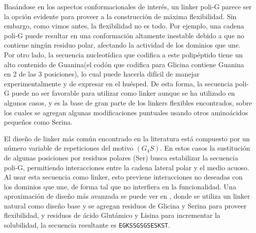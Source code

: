 
Basándose en los aspectos conformacionales de interés, un linker poli-G parece ser la opción evidente para proveer a la construcción de máxima flexibilidad.
Sin embargo, como vimos antes, la flexibilidad no es todo. 
Por ejemplo, una cadena poli-G puede resultar en una conformación altamente inestable debido a que no contiene ningún residuo polar, afectando la actividad de los dominios que une\cite{robinson1998optimizing}. 
Por otro lado, la secuencia nucleotídica que codifica a este polipéptido tiene un alto contenido de Guanina(el codón que codifica para Glicina contiene Guanina en 2 de las 3 posiciones), lo cual  
puede hacerla difícil de manejar experimentalmente y de expresar en el huésped\cite{trinh2004optimization}.
De esta forma, la secuencia poli-G puede no ser favorable para utilizar como linker aunque se ha utilizado en algunos casos\cite{iwakura1998effects,de2012characterization,sabourin2007flexible}, 
y es la base de gran parte de los linkers flexibles encontrados, sobre los cuales se agregan algunas modificaciones puntuales usando otros aminoácidos pequeños como Serina.%

El diseño de linker más común encontrado en la literatura está compuesto por un número variable de repeticiones del motivo $(G_4S)$. %
En estos casos la sustitución de algunas posiciones por residuos polares (Ser) busca estabilizar la secuencia poli-G, permitiendo interacciones entre la cadena lateral polar y el medio acuoso. 
Al usar esta secuencia como linker, esto previene interacciones no deseadas con los dominios que une, de forma tal que no interfiera en la funcionalidad.
Una aproximación de diseño más avanzada se puede ver en \cite{bird1988single}, donde se utiliza un linker natural como diseño base y se agregan residuos de Glicina y Serina para proveer flexibilidad, 
y residuos de ácido Glutámico y Lisina para incrementar la solubilidad, la secuencia resultante es \texttt{EGKSSGSGSESKST}.



